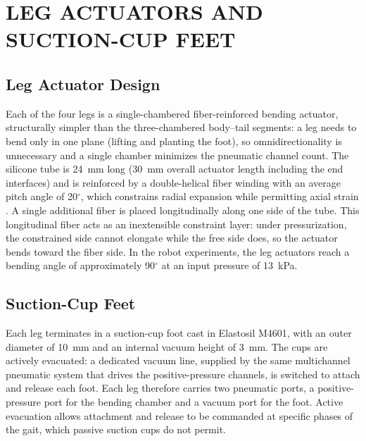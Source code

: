 

\section{LEG ACTUATORS AND SUCTION-CUP FEET}
\label{sec:lizard-legs}

\subsection{Leg Actuator Design}

Each of the four legs is a single-chambered fiber-reinforced bending
actuator, structurally simpler than the three-chambered body--tail
segments: a leg needs to bend only in one plane (lifting and planting the
foot), so omnidirectionality is unnecessary and a single chamber
minimizes the pneumatic channel count. The silicone tube is 24~mm long
(30~mm overall actuator length including the end interfaces) and is
reinforced by a double-helical fiber winding with an average pitch angle
of 20$^{\circ}$, which constrains radial expansion while permitting axial
strain \cite{Mao2020Soft}. A single additional fiber is placed
longitudinally along one side of the tube. This longitudinal fiber acts
as an inextensible constraint layer: under pressurization, the
constrained side cannot elongate while the free side does, so the
actuator bends toward the fiber side. In the robot experiments, the leg
actuators reach a bending angle of approximately 90$^{\circ}$ at an input
pressure of 13~kPa.

\subsection{Suction-Cup Feet}

Each leg terminates in a suction-cup foot cast in Elastosil M4601, with
an outer diameter of 10~mm and an internal vacuum height of 3~mm. The
cups are actively evacuated: a dedicated vacuum line, supplied by the
same multichannel pneumatic system that drives the positive-pressure
channels, is switched to attach and release each foot. Each leg therefore
carries two pneumatic ports, a positive-pressure port for the bending
chamber and a vacuum port for the foot. Active evacuation allows
attachment and release to be commanded at specific phases of the gait,
which passive suction cups do not permit.

